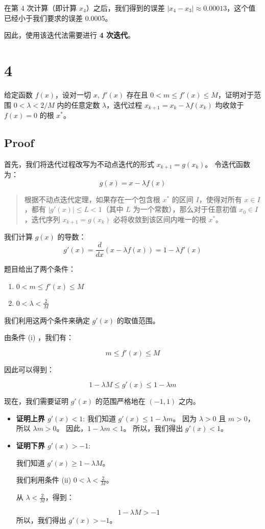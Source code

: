 \documentclass[11pt]{article}
\begin{document}
在第 4 次计算（即计算 \(x_4\)）之后，我们得到的误差
\(|x_4 - x_3| \approx 0.00013\)，这个值已经小于我们要求的误差 0.0005。

因此，使用该迭代法需要进行 \textbf{4 次迭代}。

    \section{4}\label{section}

给定函数 \(f(x)\)，设对一切 \(x\), \(f'(x)\) 存在且
\(0 < m \le f'(x) \le M\)，证明对于范围 \(0 < \lambda < 2/M\)
内的任意定数 \(\lambda\)，迭代过程 \(x_{k+1} = x_k - \lambda f(x_k)\)
均收敛于 \(f(x) = 0\) 的根 \(x^*\)。

\subsection{Proof}\label{proof}

首先，我们将迭代过程改写为不动点迭代的形式 \(x_{k+1} = g(x_k)\)。
令迭代函数为： \[ g(x) = x - \lambda f(x) \]

\begin{quote}
根据不动点迭代定理，如果存在一个包含根 \(x^*\) 的区间 \(I\)，使得对所有
\(x \in I\)，都有 \(|g'(x)| \le L < 1\)（其中 \(L\)
为一个常数），那么对于任意初值 \(x_0 \in I\)，迭代序列
\(x_{k+1} = g(x_k)\) 必将收敛到该区间内唯一的根 \(x^*\)。
\end{quote}

我们计算 \(g(x)\) 的导数：
\[ g'(x) = \frac{d}{dx} \left( x - \lambda f(x) \right) = 1 - \lambda f'(x) \]

题目给出了两个条件：

\begin{enumerate}
\def\labelenumi{(\roman{enumi})}
\item
  \(0 < m \le f'(x) \le M\)
\item
  \(0 < \lambda < \frac{2}{M}\)
\end{enumerate}

我们利用这两个条件来确定 \(g'(x)\) 的取值范围。

由条件 (i) ，我们有：

\[ m \le f'(x) \le M \]

因此可以得到：

\[ 1 - \lambda M \le g'(x) \le 1 - \lambda m \]

现在，我们需要证明 \(g'(x)\) 的范围严格地在 \((-1, 1)\) 之内。

\begin{itemize}
\item
  \textbf{证明上界 \(g'(x) < 1\)}: 我们知道
  \(g'(x) \le 1 - \lambda m\)。 因为 \(\lambda > 0\) 且 \(m > 0\)，所以
  \(\lambda m > 0\)。 因此，\(1 - \lambda m < 1\)。 所以，我们得出
  \(g'(x) < 1\)。
\item
  \textbf{证明下界 \(g'(x) > -1\)}:

  我们知道 \(g'(x) \ge 1 - \lambda M\)。

  我们利用条件 (ii) \(0 < \lambda < \frac{2}{M}\)。

  从 \(\lambda < \frac{2}{M}\)，得到：

  \[ 1 - \lambda M > -1 \] 所以，我们得出 \(g'(x) > -1\)。
\end{itemize}
\end{document}
